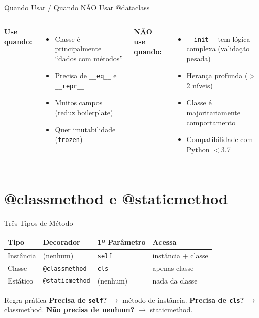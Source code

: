 \documentclass[aspectratio=169]{beamer}
\begin{document}
\begin{frame}{Quando Usar / Quando NÃO Usar @dataclass}
\begin{columns}[T]
\textbf{Use quando:}
\begin{itemize}
  \item Classe é principalmente ``dados com métodos''
  \item Precisa de \texttt{\_\_eq\_\_} e \texttt{\_\_repr\_\_}
  \item Muitos campos (reduz boilerplate)
  \item Quer imutabilidade (\texttt{frozen})
\end{itemize}

\textbf{NÃO use quando:}
\begin{itemize}
  \item \texttt{\_\_init\_\_} tem lógica complexa (validação pesada)
  \item Herança profunda ($>$2 níveis)
  \item Classe é majoritariamente comportamento
  \item Compatibilidade com Python $<$3.7
\end{itemize}
\end{columns}
\end{frame}

\section{@classmethod e @staticmethod}

\begin{frame}{Três Tipos de Método}
\begin{table}
\centering
\begin{tabular}{llll}
\toprule
\textbf{Tipo} & \textbf{Decorador} & \textbf{1º Parâmetro} & \textbf{Acessa} \\
\midrule
Instância   & (nenhum)          & \texttt{self} & instância + classe \\
Classe      & \texttt{@classmethod}  & \texttt{cls}  & apenas classe \\
Estático    & \texttt{@staticmethod} & (nenhum)      & nada da classe \\
\bottomrule
\end{tabular}
\end{table}

\begin{exampleblock}{Regra prática}
\textbf{Precisa de \texttt{self}?} $\to$ método de instância.
\textbf{Precisa de \texttt{cls}?} $\to$ classmethod.
\textbf{Não precisa de nenhum?} $\to$ staticmethod.
\end{exampleblock}
\end{frame}
\end{document}
